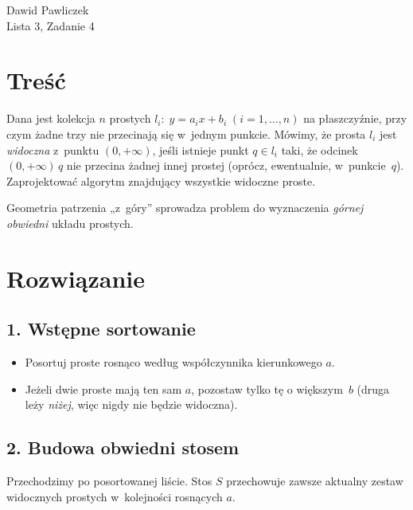 \documentclass[11pt,a4paper]{article}
\begin{document}
\begin{center}
\Large Dawid Pawliczek\\
Lista 3, Zadanie 4
\end{center}

\bigskip
\section*{Treść}

Dana jest kolekcja $n$ prostych
\(
  l_i :\; y=a_i x + b_i
  \;(i=1,\dots,n)
\)
na płaszczyźnie, przy czym żadne trzy nie przecinają się
w~jednym punkcie.
Mówimy, że prosta $l_i$ jest \emph{widoczna}
z~punktu $(0,+\infty)$,
jeśli istnieje punkt $q\in l_i$ taki,
że odcinek $(0,+\infty)\,q$
nie przecina żadnej innej prostej (oprócz, ewentualnie, w~punkcie~$q$).
Zaprojektować algorytm znajdujący wszystkie widoczne proste.

Geometria patrzenia „z~góry” sprowadza problem
do wyznaczenia \emph{górnej obwiedni} układu prostych.

\section*{Rozwiązanie}

\subsection*{1. Wstępne sortowanie}

\begin{itemize}
\item
Posortuj proste rosnąco według współczynnika kierunkowego $a$.
\item
Jeżeli dwie proste mają ten sam $a$, pozostaw tylko tę
o większym~$b$ (druga leży \emph{niżej},
więc nigdy nie będzie widoczna).
\end{itemize}

\subsection*{2. Budowa obwiedni stosem}

Przechodzimy po posortowanej liście.
Stos $S$ przechowuje zawsze aktualny zestaw widocznych prostych
w~kolejności rosnących $a$.
\end{document}
